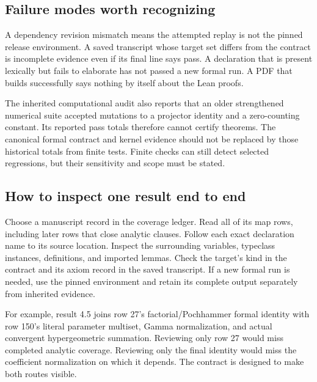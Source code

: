 \subsection{Failure modes worth recognizing}
A dependency revision mismatch means the attempted replay is not the pinned release environment. A saved transcript whose target set differs from the contract is incomplete evidence even if its final line says pass. A declaration that is present lexically but fails to elaborate has not passed a new formal run. A PDF that builds successfully says nothing by itself about the Lean proofs.

The inherited computational audit also reports that an older strengthened numerical suite accepted mutations to a projector identity and a zero-counting constant. Its reported pass totals therefore cannot certify theorems. The canonical formal contract and kernel evidence should not be replaced by those historical totals from finite tests. Finite checks can still detect selected regressions, but their sensitivity and scope must be stated.

\subsection{How to inspect one result end to end}
Choose a manuscript record in the coverage ledger. Read all of its map rows, including later rows that close analytic clauses. Follow each exact declaration name to its source location. Inspect the surrounding variables, typeclass instances, definitions, and imported lemmas. Check the target's kind in the contract and its axiom record in the saved transcript. If a new formal run is needed, use the pinned environment and retain its complete output separately from inherited evidence.

For example, result 4.5 joins row 27's factorial/Pochhammer formal identity with row 150's literal parameter multiset, Gamma normalization, and actual convergent hypergeometric summation. Reviewing only row 27 would miss completed analytic coverage. Reviewing only the final identity would miss the coefficient normalization on which it depends. The contract is designed to make both routes visible.
